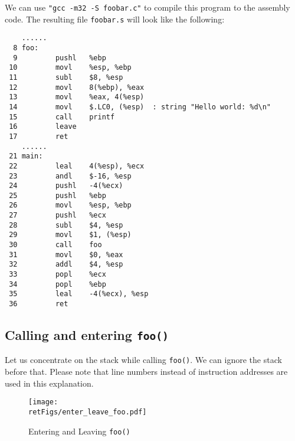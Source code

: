 We can use {\tt "gcc -m32 -S foobar.c"} to
compile this program to the assembly code.
The resulting file {\tt foobar.s} will look like the following:


\begin{lstlisting}
    ......
  8 foo:
  9         pushl   %ebp
 10         movl    %esp, %ebp
 11         subl    $8, %esp
 12         movl    8(%ebp), %eax   
 13         movl    %eax, 4(%esp)
 14         movl    $.LC0, (%esp)  : string "Hello world: %d\n"
 15         call    printf
 16         leave
 17         ret
    ......
 21 main:
 22         leal    4(%esp), %ecx
 23         andl    $-16, %esp
 24         pushl   -4(%ecx)
 25         pushl   %ebp
 26         movl    %esp, %ebp
 27         pushl   %ecx
 28         subl    $4, %esp
 29         movl    $1, (%esp)
 30         call    foo
 31         movl    $0, %eax
 32         addl    $4, %esp
 33         popl    %ecx
 34         popl    %ebp
 35         leal    -4(%ecx), %esp
 36         ret
\end{lstlisting}
 


\subsection{Calling and entering {\tt foo()}}

Let us concentrate on the stack while calling {\tt foo()}. We can ignore the stack
before that. Please note that line numbers instead of instruction addresses are
used in this explanation. 



\begin{figure}[htb]
	\centering
	\texttt{[image: \\retFigs/enter\_leave\_foo.pdf]}
	\caption{Entering and Leaving {\tt foo()}}
	\label{fig:enter_leave_foo}
\end{figure}


